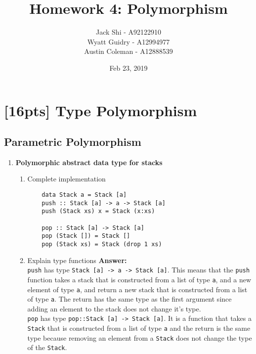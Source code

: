 \documentclass{article}
\title{Homework 4: Polymorphism}
\date{Feb 23, 2019}
\author{Jack Shi - A92122910 \\
				Wyatt Guidry - A12994977 \\
				Austin Coleman - A12888539}
\begin{document}
\maketitle
\section{[16pts] Type Polymorphism}
\subsection{Parametric Polymorphism}
\begin{enumerate}
	\item \textbf{Polymorphic abstract data type for stacks}
		\begin{enumerate}
			\item Complete implementation
				\begin{lstlisting}
	data Stack a = Stack [a]
	push :: Stack [a] -> a -> Stack [a]
	push (Stack xs) x = Stack (x:xs)

	pop :: Stack [a] -> Stack [a]
	pop (Stack []) = Stack []
	pop (Stack xs) = Stack (drop 1 xs)
				\end{lstlisting}

			\item Explain type functions
				\textbf{Answer: }\\
				\texttt{push} has type \texttt{Stack [a] -> a -> Stack
				[a]}. This means that the \texttt{push} function takes a stack that is
				constructed from a list of type \texttt{a}, and a new element of type
				\texttt{a}, and return a new stack that is constructed from a list of
				type \texttt{a}. The return has the same type as the first argument
				since adding an element to the stack does not change it's type.\\
				\texttt{pop} has type \texttt{pop::Stack [a] -> Stack [a]}. It is a
				function that takes a \texttt{Stack} that is constructed from a list of
				type \texttt{a} and the return is the same type because removing an
				element from a \texttt{Stack} does not change the type of the \texttt{Stack}.
		\end{enumerate}
\end{enumerate}

\end{document}
